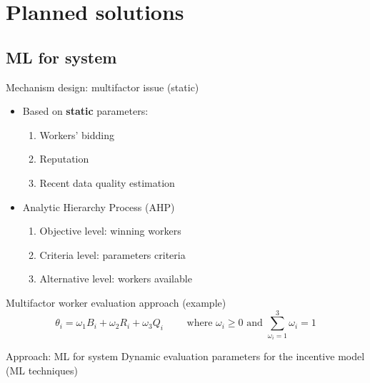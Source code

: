 

\section{Planned solutions}

\subsection{ML for system}

\begin{frame}{Mechanism design: multifactor issue (static)}
\begin{multicols}{2}
  \begin{itemize}
    \item Based on \textbf{static} parameters:
          \begin{enumerate}
            \item \alert{Workers' bidding}
            \item \alert{Reputation}
            \item \alert{Recent data quality estimation}
          \end{enumerate}
    \item Analytic Hierarchy Process (AHP)
    	\begin{enumerate}
            \item \alert{Objective level}: winning workers
            \item \alert{Criteria level}: parameters criteria
            \item \alert{Alternative level}: workers available
          \end{enumerate}
    \end{itemize}
\end{multicols}
    \begin{exampleblock}{Multifactor worker evaluation approach (example)}
    	\begin{equation*}
      	\theta_{i}=\omega_{1} B_{i}+\omega_{2} R_{i}+\omega_{3} Q_{i} \quad\quad \text { where } \omega_{i} \geq 0 \text { and } \sum_{\omega_{i}=1}^{3} \omega_{i}=1	
    	\end{equation*}
  \end{exampleblock}
  \begin{block}{Approach: ML for system}
  	Dynamic evaluation parameters for the incentive model (ML techniques)
  \end{block}
\end{frame}

